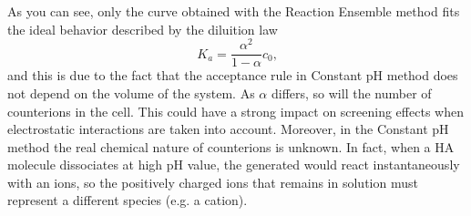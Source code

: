 \documentclass[
a4paper,                        %
11pt,                           %
twoside,                        %
footsepline,                    %
headsepline,                    %
headexclude,                    %
footexclude,                    %
pagesize,                       %
]{scrartcl}
\begin{document}
As you can see, only the curve obtained with the Reaction Ensemble method fits the ideal behavior described by the diluition law
\begin{equation}
K_{a} = \frac{\alpha^2}{1 - \alpha}c_0\text{,}
\end{equation}
and this is due to the fact that the acceptance  rule in Constant pH method does not depend on the volume of the system. As $\alpha$ differs, so will the number of counterions in the cell. This could have a strong impact on screening effects when electrostatic interactions are taken into account. Moreover, in the Constant pH method the real chemical nature of counterions is unknown. In fact, when a HA molecule dissociates at high pH value, the generated  would react instantaneously with an  ions, so the positively charged ions that remains in solution must represent a different species (e.g. a  cation).
\end{document}
